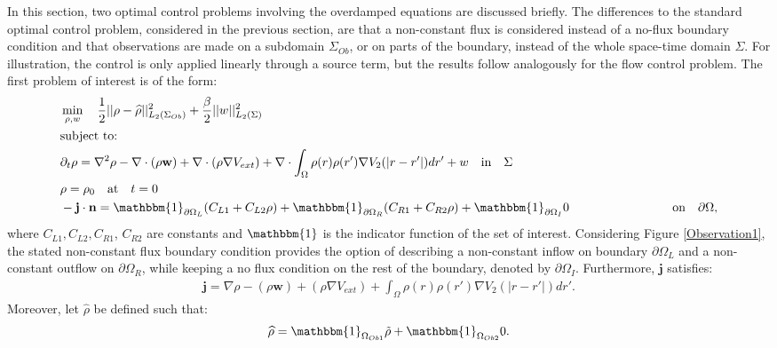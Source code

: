 

In this section, two optimal control problems involving the overdamped equations are discussed briefly. The differences to the standard optimal control problem, considered in the previous section, are that a non-constant flux is considered instead of a no-flux boundary condition and that observations are made on a subdomain $\Sigma_{Ob}$, or on parts of the boundary, instead of the whole space-time domain $\Sigma$. For illustration, the control is only applied linearly through a source term, but the results follow analogously for the flow control problem. 
The first problem of interest is of the form:
\begin{align*}
&\min_{\rho, w} \quad \frac{1}{2}|| \rho -\widehat \rho||^2_{L_2( \Sigma_{Ob})} + \frac{\beta}{2}||w||^2_{L_2(\Sigma)}\\
&\text{subject to:}\\
&\partial_t \rho = \nabla^2 \rho - \nabla \cdot (\rho \mathbf{w}) +\nabla \cdot (\rho \nabla V_{ext}) + \nabla \cdot \int_\Omega \rho(r) \rho(r') \nabla V_2(|r-r'|) dr' + w \quad  \text{in} \quad \Sigma\notag\\
& \rho = \rho_0 \quad \text{at} \quad t=0 \notag\\
& - \mathbf{j} \cdot \n = \mathbbm{1}_{\partial \Omega_L}( C_{L1}  + C_{L2}\rho) +\mathbbm{1}_{\partial \Omega_R} ( C_{R1}  + C_{R2}\rho) +\mathbbm{1}_{\partial \Omega_I} 0 \ \quad \quad\qquad\qquad  \qquad \text{on} \quad \partial \Omega, 
\end{align*}
where $C_{L1}, C_{L2}, C_{R1}$, $C_{R2}$ are constants and $\mathbbm{1}$ is the indicator function of the set of interest. Considering Figure \ref{Observation1}, the stated non-constant flux boundary condition provides the option of describing a non-constant inflow on boundary $\partial \Omega_L$ and a non-constant outflow on $\partial \Omega_R$, while keeping a no flux condition on the rest of the boundary, denoted by $\partial \Omega_I$.
Furthermore, $\mathbf{j}$ satisfies:
\begin{align*}
\mathbf{j}=\nabla \rho - (\rho \mathbf{w}) +(\rho \nabla V_{ext}) +  \int_\Omega \rho(r) \rho(r') \nabla V_2(|r-r'|) dr'.
\end{align*}
Moreover, let $\widehat \rho$ be defined such that:
\begin{align*}
\widehat \rho = \mathbbm{1}_{ \Omega_{Ob1}} \tilde \rho  +\mathbbm{1}_{ \Omega_{Ob2}} 0.
\end{align*}
